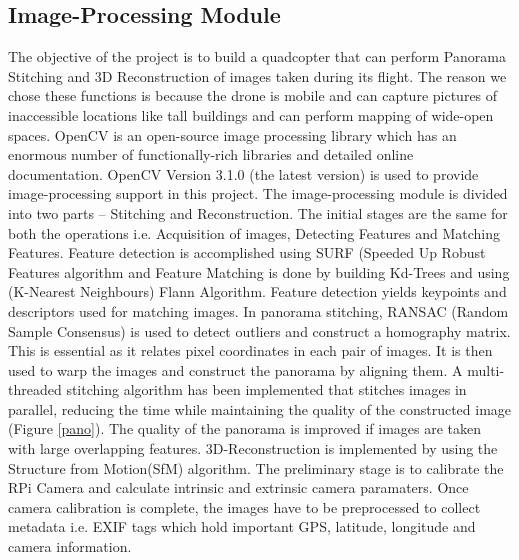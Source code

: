 \subsection{Image-Processing Module}
The objective of the project is to build a quadcopter that can perform Panorama Stitching and 3D Reconstruction of images taken during its flight. The reason we chose these functions is because the drone is mobile and can capture pictures of inaccessible locations like tall buildings and can perform mapping of wide-open spaces.\newline
 OpenCV is an open-source image processing library which has an enormous number of functionally-rich libraries and detailed online documentation. OpenCV  Version 3.1.0 (the latest version) is used to provide image-processing support in this project.
\newline
\newline
The image-processing module is divided into two parts – Stitching and Reconstruction. The initial stages are the same for both the operations i.e. Acquisition of images, Detecting Features and Matching Features. Feature detection is accomplished using SURF (Speeded Up Robust Features  algorithm and Feature Matching is done by building Kd-Trees and using (K-Nearest Neighbours) Flann Algorithm. Feature detection yields keypoints and descriptors used for matching images.
\newline
\newline
In panorama stitching, RANSAC (Random Sample Consensus) is used to detect outliers and construct a homography matrix. This is essential as it relates pixel coordinates in each pair of images. It is then used to warp the images and construct the panorama by aligning them.
A multi-threaded stitching algorithm has been implemented that stitches images in parallel, reducing the time while maintaining the quality of the constructed image (Figure \ref{pano}). The quality of the panorama is improved if images are taken with large overlapping features.
\newline
\newline
 3D-Reconstruction is implemented by using the Structure from Motion(SfM) algorithm. The preliminary stage is to calibrate the RPi Camera and calculate intrinsic and extrinsic camera paramaters. Once camera calibration is complete, the images have to be preprocessed to collect metadata i.e. EXIF tags which hold important GPS, latitude, longitude and camera information. 
\newline
\newline
